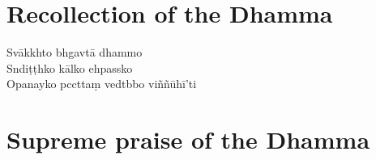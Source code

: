 %
%
%

\chapter{Recollection of the Dhamma}%

\begin{leader}
\end{leader}

Svākkhto bhgavtā dhammo\\
Sndiṭṭhko kālko ehpassko\\
Opanayko pccttaṃ vedtbbo viññūhī'ti


\chapter{Supreme praise of the Dhamma}%

\begin{leader}
\end{leader}

